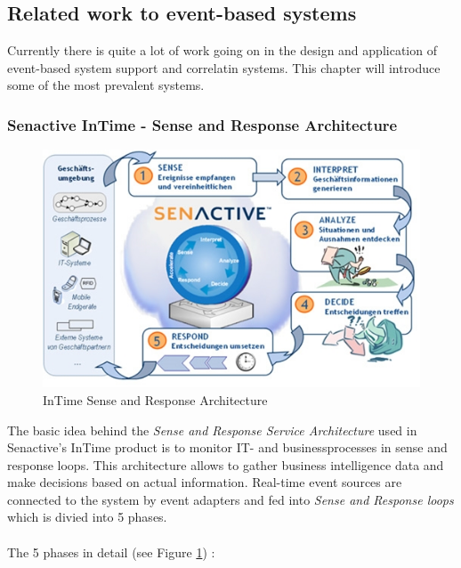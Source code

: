 \documentclass[a4paper,titlepage,11pt,DIV10,BCOR0.5cm,headinclude]{article}
\begin{document}
\subsection{Related work to event-based systems}
Currently there is quite a lot of work going on in the design and application of event-based system support and correlatin systems. This chapter will introduce some of the most prevalent systems.

\subsubsection{Senactive InTime - Sense and Response Architecture}
\begin{figure} [ht]                
	\centering                                           
	\includegraphics[width=1\textwidth]{pics/senseAndResponseSenactive.jpg}
	\caption{InTime Sense and Response Architecture \cite{SenactiveWebpage}}             
	\label{fig:senseAndResponseSenactive}
\end{figure}  
The basic idea behind the \textit{Sense and Response Service Architecture} used in Senactive's InTime product is to monitor IT- and businessprocesses in sense and response loops. This architecture allows to gather business intelligence data and make decisions based on actual information. Real-time event sources are connected to the system by event adapters and fed into \textit{Sense and Response loops} which is divied into 5 phases. 
\\\\
The 5 phases in detail (see Figure \ref{fig:senseAndResponseSenactive}) \cite{NguyenSchieferTjoa05} :
\end{document}
